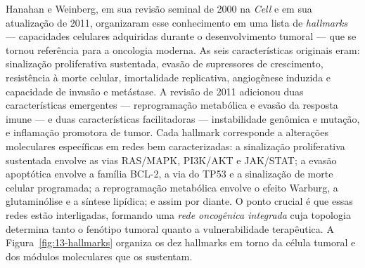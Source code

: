 Hanahan e Weinberg, em sua revisão seminal de 2000 na \emph{Cell} e em sua atualização de 2011, organizaram esse conhecimento em uma lista de \emph{hallmarks} --- capacidades celulares adquiridas durante o desenvolvimento tumoral --- que se tornou referência para a oncologia moderna. As seis características originais eram: sinalização proliferativa sustentada, evasão de supressores de crescimento, resistência à morte celular, imortalidade replicativa, angiogênese induzida e capacidade de invasão e metástase. A revisão de 2011 adicionou duas características emergentes --- reprogramação metabólica e evasão da resposta imune --- e duas características facilitadoras --- instabilidade genômica e mutação, e inflamação promotora de tumor. Cada hallmark corresponde a alterações moleculares específicas em redes bem caracterizadas: a sinalização proliferativa sustentada envolve as vias RAS/MAPK, PI3K/AKT e JAK/STAT; a evasão apoptótica envolve a família BCL-2, a via do TP53 e a sinalização de morte celular programada; a reprogramação metabólica envolve o efeito Warburg, a glutaminólise e a síntese lipídica; e assim por diante. O ponto crucial é que essas redes estão interligadas, formando uma \emph{rede oncogênica integrada} cuja topologia determina tanto o fenótipo tumoral quanto a vulnerabilidade terapêutica. A Figura~\ref{fig:13-hallmarks} organiza os dez hallmarks em torno da célula tumoral e dos módulos moleculares que os sustentam.

